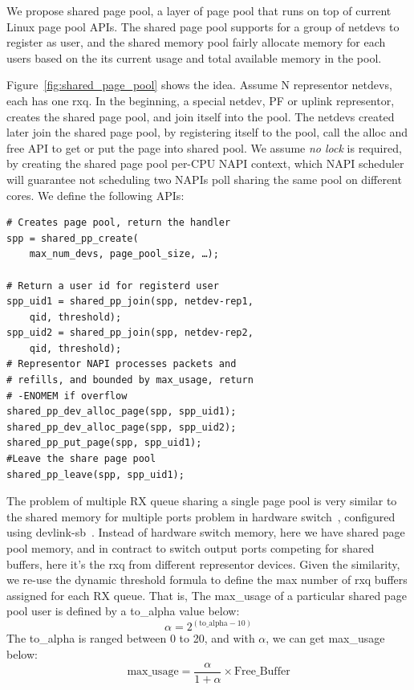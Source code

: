 \documentclass[letterpaper]{article}
\begin{document}
We propose shared page pool, a layer of page pool that runs on top of current
Linux page pool APIs. The shared page pool supports for a group of netdevs
to register as user, and the shared memory pool fairly allocate memory for
each users based on the its current usage and total available memory in
the pool.

Figure~\ref{fig:shared_page_pool} shows the idea.
Assume N representor netdevs, each has one rxq. In the beginning, a special
netdev, PF or uplink representor, creates the shared page pool, and join
itself into the pool. The netdevs created later join the shared page pool,
by registering itself to the pool, call the alloc and free API to
get or put the page into shared pool. We assume \emph{no lock} is required,
by creating the shared page pool per-CPU NAPI context, which NAPI scheduler
will guarantee not scheduling two NAPIs poll sharing the same pool on
different cores. We define the following APIs:
\begin{verbatim}
# Creates page pool, return the handler
spp = shared_pp_create(
    max_num_devs, page_pool_size, …);

# Return a user id for registerd user
spp_uid1 = shared_pp_join(spp, netdev-rep1,
    qid, threshold);
spp_uid2 = shared_pp_join(spp, netdev-rep2,
    qid, threshold);
# Representor NAPI processes packets and
# refills, and bounded by max_usage, return
# -ENOMEM if overflow
shared_pp_dev_alloc_page(spp, spp_uid1);
shared_pp_dev_alloc_page(spp, spp_uid2);
shared_pp_put_page(spp, spp_uid1);
#Leave the share page pool
shared_pp_leave(spp, spp_uid1); 
\end{verbatim}

The problem of multiple RX queue sharing a single page pool is
very similar to the shared memory for multiple ports problem in
hardware switch~\cite{}, configured using devlink-sb~\cite{devlinksb}.
Instead of hardware switch memory, here we have shared page pool memory,
and in contract to switch output ports competing for shared buffers,
here it's the rxq from different representor devices.
Given the similarity, we re-use the dynamic threshold formula to define
the max number of rxq buffers assigned for each RX queue. That is,
The max\_usage of a particular shared page pool user is
defined by a to\_alpha value below:
\begin{equation}
\alpha = 2^{(\text{to\_alpha} - 10)}
\end{equation}
The to\_alpha is ranged between 0 to 20, and with $\alpha$, we can get
max\_usage below:
\begin{equation}
\text{max\_usage} = \frac{\alpha}{1 + \alpha} \times \text{Free\_Buffer}
\end{equation}
\end{document}
